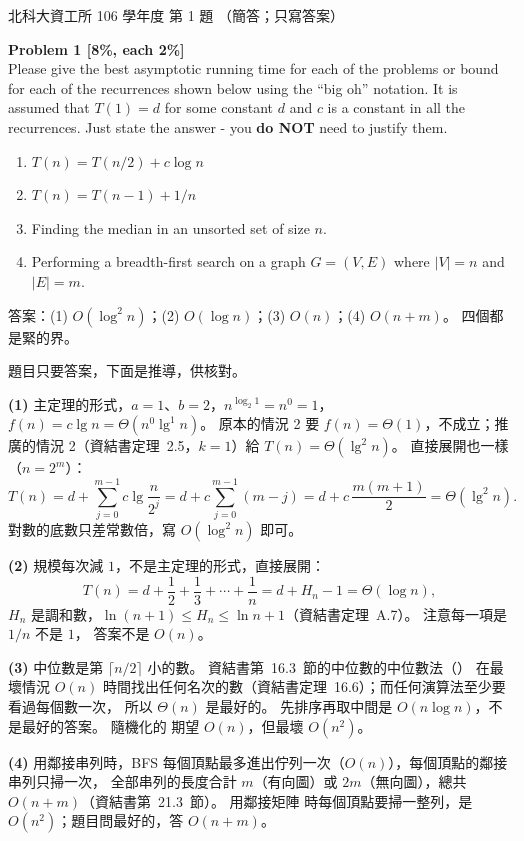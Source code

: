 \begin{pastexam}[label={px:ntut-106-prog-01}]{北科大資工所 106 學年度 第 1 題}
（簡答；只寫答案）

\textbf{Problem 1 [8\%, each 2\%]}\\
Please give the best asymptotic running time for each of the problems or bound for each of the
recurrences shown below using the ``big oh'' notation. It is assumed that $T(1)=d$ for some
constant $d$ and $c$ is a constant in all the recurrences. Just state the answer - you
\textbf{do NOT} need to justify them.
\begin{enumerate}[label=(\arabic*)]
\item $T(n)=T(n/2)+c\log n$
\item $T(n)=T(n-1)+1/n$
\item Finding the median in an unsorted set of size $n$.
\item Performing a breadth-first search on a graph $G=(V,E)$ where $|V|=n$ and $|E|=m$.
\end{enumerate}
\end{pastexam}

\begin{pastsoln}
答案：(1) $O(\log^2 n)$；(2) $O(\log n)$；(3) $O(n)$；(4) $O(n + m)$。 四個都是緊的界。

題目只要答案，下面是推導，供核對。

\textbf{(1)} 主定理的形式，$a = 1$、$b = 2$，$n^{\log_2 1} = n^0 = 1$，$f(n) = c \lg n = \Theta(n^0 \lg^1 n)$。
原本的情況 2 要 $f(n) = \Theta(1)$，不成立；推廣的情況 2（資結書定理~2.5，$k = 1$）給
$T(n) = \Theta(\lg^2 n)$。 直接展開也一樣（$n = 2^m$）：
\[
T(n) = d + \sum_{j=0}^{m-1} c \lg \frac{n}{2^j} = d + c \sum_{j=0}^{m-1} (m - j) = d + c\,\frac{m(m+1)}{2}
= \Theta(\lg^2 n).
\]
對數的底數只差常數倍，寫 $O(\log^2 n)$ 即可。

\textbf{(2)} 規模每次減 $1$，不是主定理的形式，直接展開：
\[
T(n) = d + \frac12 + \frac13 + \cdots + \frac1n = d + H_n - 1 = \Theta(\log n),
\]
$H_n$ 是調和數，$\ln(n+1) \le H_n \le \ln n + 1$（資結書定理~A.7）。 注意每一項是 $1/n$ 不是 $1$，
答案不是 $O(n)$。

\textbf{(3)} 中位數是第 $\lceil n/2 \rceil$ 小的數。 資結書第~16.3~節的中位數的中位數法（）
在最壞情況 $O(n)$ 時間找出任何名次的數（資結書定理~16.6）；而任何演算法至少要看過每個數一次，
所以 $\Theta(n)$ 是最好的。 先排序再取中間是 $O(n \log n)$，不是最好的答案。 隨機化的
 期望 $O(n)$，但最壞 $O(n^2)$。

\textbf{(4)} 用鄰接串列時，BFS 每個頂點最多進出佇列一次（$O(n)$），每個頂點的鄰接串列只掃一次，
全部串列的長度合計 $m$（有向圖）或 $2m$（無向圖），總共 $O(n + m)$（資結書第~21.3~節）。 用鄰接矩陣
時每個頂點要掃一整列，是 $O(n^2)$；題目問最好的，答 $O(n + m)$。
\end{pastsoln}
